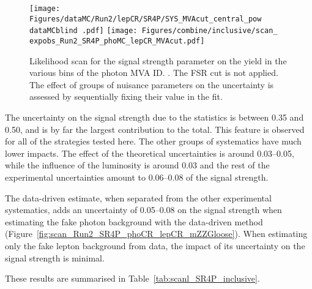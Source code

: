 \begin{figure}
  \centering
  \texttt{[image: Figures/dataMC/Run2/lepCR/SR4P/SYS\_MVAcut\_central\_pow\\dataMCblind .pdf]}
  \hfill
  \texttt{[image: Figures/combine/inclusive/scan\_\\expobs\_Run2\_SR4P\_phoMC\_lepCR\_MVAcut.pdf]}
  \caption{Likelihood scan for the signal strength parameter
    on the yield in the various bins of the photon MVA ID.
    .
    The FSR cut is not applied.
    The effect of groups of nuisance parameters on the uncertainty is assessed by sequentially fixing their value in the fit.
  }
  \label{fig:scan_Run2_SR4P_phoMC_lepCR_MVAcut}
\end{figure}

The uncertainty on the signal strength due to the statistics is between 0.35 and 0.50,
and is by far the largest contribution to the total.
This feature is observed for all of the strategies tested here.
The other groups of systematics have much lower impacts.
The effect of the theoretical uncertainties is around 0.03--0.05,
while the influence of the luminosity is around 0.03
and the rest of the experimental uncertainties amount to 0.06--0.08 of the signal strength.

The data-driven estimate, when separated from the other experimental systematics,
adds an uncertainty of 0.05--0.08 on the signal strength when estimating the fake photon background
with the data-driven method (Figure~\ref{fig:scan_Run2_SR4P_phoCR_lepCR_mZZGloose}).
When estimating only the fake lepton background from data, the impact of its uncertainty on the signal strength is minimal.

These results are summarised in Table~\ref{tab:scanl_SR4P_inclusive}.

